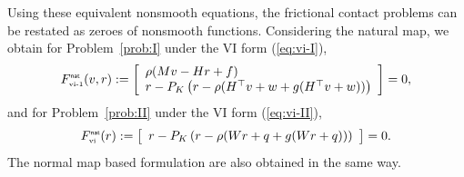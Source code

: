 Using these equivalent nonsmooth equations, the frictional contact problems can be restated as zeroes of nonsmooth functions. Considering the natural map, we obtain for Problem~\ref{prob:I} under the VI form (\ref{eq:vi-I}),
\begin{equation}
  \label{eq:natural-I}
  F_\vione^\nat(v,r) := \left[
  \begin{array}{l}
    \rho (Mv - Hr + f) \\
    r - P_{K}\left(r  - \rho (H^\top v +w  + g(H^\top v +w))\right)
  \end{array}\right] = 0,
\end{equation}
and  for Problem~\ref{prob:II} under the VI form (\ref{eq:vi-II}),
\begin{equation}
  \label{eq:natural-II}
  F_\vitwo^\nat(r) :=   \left[
  \begin{array}{l} 
    r - P_{K}\left(r  - \rho (W r +q + g(W r +q))\right) 
  \end{array}\right] 
  = 0.
\end{equation}
The normal map based formulation are also obtained in the same way. 

